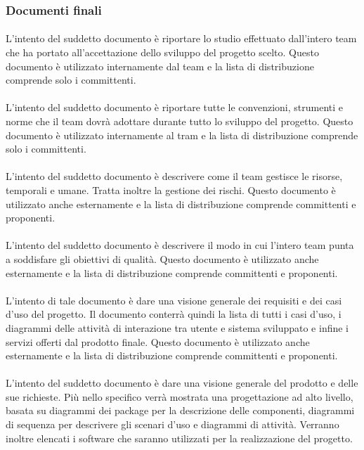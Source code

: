 \subsubsection{Documenti finali}
\paragraph{\SdF}
L'intento del suddetto documento è riportare lo studio effettuato dall'intero 
team che ha portato all'accettazione dello sviluppo del progetto scelto. Questo 
documento è utilizzato internamente dal team e la lista di distribuzione comprende solo i 
committenti.
\paragraph{\NdP}
L'intento del suddetto documento è riportare tutte le convenzioni, strumenti e 
norme che il team dovrà adottare durante tutto lo sviluppo del progetto. Questo 
documento è utilizzato internamente al tram e la lista di distribuzione comprende solo i committenti. 
\paragraph{\PdP}
L'intento del suddetto documento è descrivere come il team gestisce le risorse, 
temporali e umane. Tratta inoltre la gestione dei rischi. Questo documento è 
utilizzato anche esternamente e la lista di distribuzione comprende committenti 
e proponenti.
\paragraph{\PdQ}
L'intento del suddetto documento è descrivere il modo in cui l'intero team punta 
a soddisfare gli obiettivi di qualità. Questo documento è 
utilizzato anche esternamente e la lista di distribuzione comprende committenti 
e proponenti.
\paragraph{\AdR}
L'intento di tale documento è dare una visione generale dei requisiti e dei casi 
d'uso del progetto. Il documento conterrà quindi la lista di tutti i casi d'uso, 
i diagrammi delle attività di interazione tra utente e sistema sviluppato e 
infine i servizi offerti dal prodotto finale. Questo documento è 
utilizzato anche esternamente e la lista di distribuzione comprende committenti 
e proponenti.
\paragraph{\ST}
L'intento del suddetto documento è dare una visione generale del prodotto e 
delle sue richieste. Più nello specifico verrà mostrata una progettazione ad 
alto livello, basata su diagrammi dei package per la descrizione delle 
componenti, diagrammi di sequenza per descrivere gli scenari d'uso e diagrammi 
di attività. Verranno inoltre elencati i software che saranno utilizzati per la realizzazione del progetto. 
